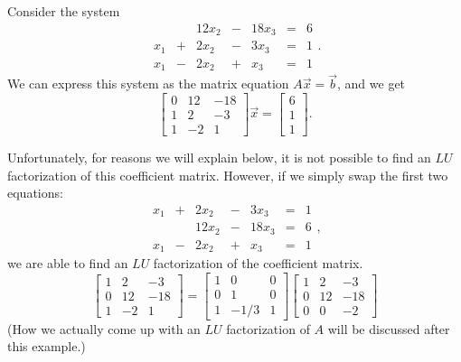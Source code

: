 \documentclass{ximera}
\begin{document}
\begin{example}\label{ex:usingLU}
Consider the system
$$\begin{array}{ccccccccc}
        & &12x_2&-&18x_3&= &6 \\
	 x_1 &+ &2x_2&-&3x_3&= &1\\
      x_1&- &2x_2&+&x_3&=&1
    \end{array}.$$
We can express this system as the matrix equation $A\vec{x}=\vec{b}$, and we get $$\begin{bmatrix}0&12&-18\\1&2&-3\\1&-2&1\end{bmatrix}\vec{x}=\begin{bmatrix}6\\1\\1\end{bmatrix}.$$

Unfortunately, for reasons we will explain below, it is not possible to find an $LU$ factorization of this coefficient matrix.  However, if we simply swap the first two equations:
$$\begin{array}{ccccccccc}
	 x_1 &+ &2x_2&-&3x_3&= &1\\
	  & &12x_2&-&18x_3&= &6 \\
      x_1&- &2x_2&+&x_3&=&1
    \end{array},$$
we are able to find an $LU$ factorization of the coefficient matrix.
\[
\begin{bmatrix}
1 & 2 & -3 \\
0 & 12 & -18 \\
1 & -2 & 1\end{bmatrix}
=
\begin{bmatrix}
1 & 0 & 0 \\
0 & 1 & 0 \\
1  & -1/3  & 1
\end{bmatrix} 
\begin{bmatrix}
1 & 2 & -3 \\
0 & 12  & -18 \\
0 & 0 & -2
\end{bmatrix}
\]
(How we actually come up with an  $LU$ factorization of $A$ will be discussed after this example.)


\end{example}
\end{document}
